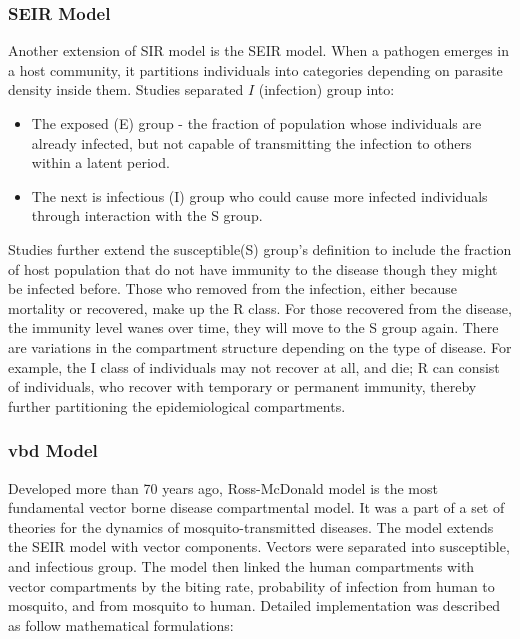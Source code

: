 \documentclass[a4paper, 12pt, twoside]{report}
\begin{document}
\subsubsection{SEIR Model}
Another extension of SIR model is the SEIR model.
When a pathogen emerges in a host community, it partitions individuals into categories depending on parasite density inside them.
Studies separated $I$ (infection) group into:
\begin{itemize}
  \item The exposed (E) group - the fraction of population whose individuals are already infected, but not capable of transmitting the infection to others within a latent period.
  \item The next is infectious (I) group who could cause more infected individuals through interaction with the S group.
\end{itemize}
Studies further extend the susceptible(S) group's definition to include the fraction of host population that do not have immunity to the disease though they might be infected before.
Those who removed from the infection, either because mortality or recovered, make up the R class. For those recovered from the disease, the immunity level wanes over time, they will move to the S group again.
There are variations in the compartment structure depending on the type of disease.
For example, the I class of individuals may not recover at all, and die; R can consist of individuals, who recover with temporary or permanent immunity, thereby further partitioning the epidemiological compartments.

\subsubsection{\gls{vbd} Model}
Developed more than 70 years ago, Ross-McDonald model is the most fundamental vector borne disease compartmental model.
It was a part of a set of theories for the dynamics of mosquito-transmitted diseases.
The model extends the SEIR model with vector components.
Vectors were separated into susceptible, and infectious group.
The model then linked the human compartments with vector compartments by the biting rate, probability of infection from human to mosquito, and from mosquito to human.
Detailed implementation was described as follow mathematical formulations:
\end{document}
